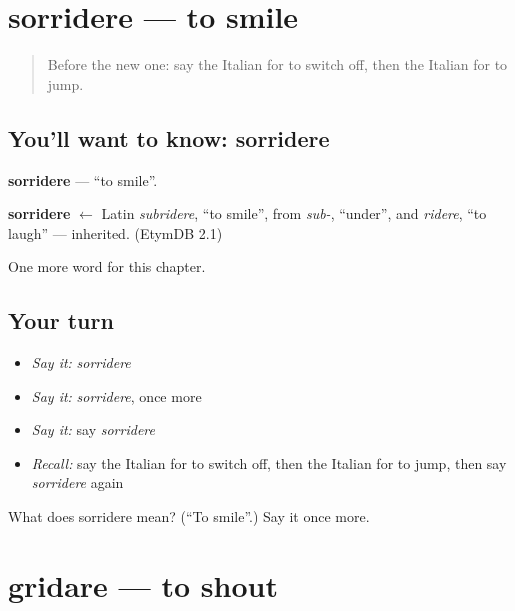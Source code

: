\section[sorridere]{sorridere — to smile}

\label{lesson:IT-C140-sorridere}



\begin{quote}
Before the new one: say the Italian for to switch off, then the Italian for to jump.
\end{quote}

\subsection*{You'll want to know: sorridere}
\textbf{sorridere} — \textquotedblleft{}to smile\textquotedblright{}.

\begin{cousinweb}
\textbf{sorridere} $\leftarrow$ Latin \emph{subridere}, \textquotedblleft{}to smile\textquotedblright{}, from \emph{sub-}, \textquotedblleft{}under\textquotedblright{}, and \emph{ridere}, \textquotedblleft{}to laugh\textquotedblright{} — inherited. (EtymDB 2.1)
\end{cousinweb}

\begin{grammarlens}[title={What you've built}]
One more word for this chapter.
\end{grammarlens}

\subsection*{Your turn}
\begin{itemize}
\raggedright
  \item \emph{Say it:} \emph{sorridere}
  \item \emph{Say it:} \emph{sorridere}, once more
  \item \emph{Say it:} say \emph{sorridere}
  \item \emph{Recall:} say the Italian for to switch off, then the Italian for to jump, then say \emph{sorridere} again
\end{itemize}

\begin{tcolorbox}[breakable,colback=teal!4,colframe=teal!35!black,title={Before you move on}]
What does sorridere mean? (\textquotedblleft{}To smile\textquotedblright{}.) Say it once more.
\end{tcolorbox}
\section[gridare]{gridare — to shout}

